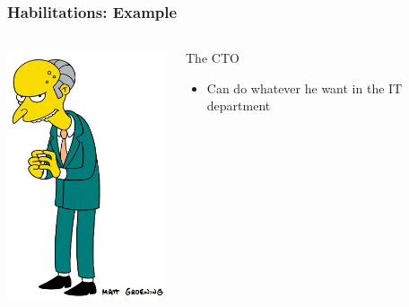 \documentclass{beamer}
\begin{document}
\begin{frame}
\frametitle{Habilitations: Example}
\begin{columns}
 \begin{column}{0.45\textwidth}
         \includegraphics[height=7.5cm]{./pics/simpsons/Montgomery_Burns.png}
 \end{column}
 \begin{column}{0.45\textwidth}
    \begin{block}{The CTO}
        \begin{itemize}
            \item Can do whatever he want in the IT department
        \end{itemize}
    \end{block}
 \end{column}
\end{columns}
\end{frame}
\end{document}

